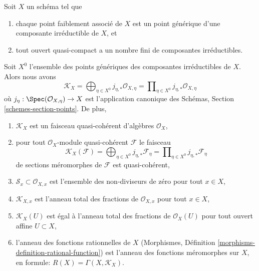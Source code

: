 \begin{lemma}
\label{lemma-meromorphic-weakass-finite}
Soit  $X$  un schéma tel que
\begin{enumerate}
\item[(a)] chaque point faiblement associé de  $X$  est un point générique d'une
composante irréductible de  $X$, et
\item[(b)] tout ouvert quasi-compact a un nombre fini de composantes irréductibles.
\end{enumerate}
Soit  $X^0$  l'ensemble des points génériques des composantes irréductibles
de  $X$. Alors nous avons
$$
\mathcal{K}_X =
\bigoplus\nolimits_{\eta \in X^0} j_{\eta, *}\mathcal{O}_{X, \eta} =
\prod\nolimits_{\eta \in X^0} j_{\eta, *}\mathcal{O}_{X, \eta}
$$
où  $j_\eta : \Spec(\mathcal{O}_{X, \eta}) \to X$  est l'application canonique des Schémas, Section  \ref{schemes-section-points}. De
plus,
\begin{enumerate}
\item $\mathcal{K}_X$  est un faisceau quasi-cohérent d'algèbres  $\mathcal{O}_X$,
\item pour tout  $\mathcal{O}_X$-module quasi-cohérent  $\mathcal{F}$  le faisceau
$$
\mathcal{K}_X(\mathcal{F}) =
\bigoplus\nolimits_{\eta \in X^0} j_{\eta, *}\mathcal{F}_\eta =
\prod\nolimits_{\eta \in X^0} j_{\eta, *}\mathcal{F}_\eta
$$
de sections méromorphes de  $\mathcal{F}$  est quasi-cohérent,
\item $\mathcal{S}_x \subset \mathcal{O}_{X, x}$  est l'ensemble des non-diviseurs de zéro pour tout  $x \in X$,
\item $\mathcal{K}_{X, x}$  est l'anneau total des fractions de  $\mathcal{O}_{X, x}$  pour tout
 $x \in X$,
\item $\mathcal{K}_X(U)$  est égal à l'anneau total des fractions de  $\mathcal{O}_X(U)$  pour tout
ouvert affine  $U \subset X$,
\item l'anneau des fonctions rationnelles de  $X$  (Morphismes, Définition
 \ref{morphisms-definition-rational-function}) est l'anneau des fonctions méromorphes sur  $X$, en formule:
 $R(X) = \Gamma(X, \mathcal{K}_X)$.
\end{enumerate}
\end{lemma}

